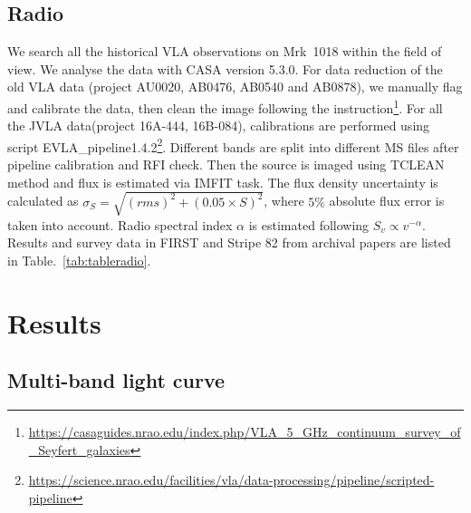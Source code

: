 \documentclass[twocolumn]{aastex63}
\begin{document}





\subsection{Radio}
We search all the historical VLA observations on Mrk~1018 within the field of view. We analyse the data with CASA version 5.3.0\citep{2007ASPC..376..127M}. For data reduction of the old VLA data (project AU0020, AB0476, AB0540 and AB0878), we manually flag and calibrate the data, then clean the image following the instruction\footnote{\url{https://casaguides.nrao.edu/index.php/VLA_5_GHz_continuum_survey_of_Seyfert_galaxies}}. For all the JVLA data(project 16A-444, 16B-084), calibrations are performed using script EVLA\_pipeline1.4.2\footnote{\url{https://science.nrao.edu/facilities/vla/data-processing/pipeline/scripted-pipeline}}. Different bands are split into different MS files after pipeline calibration and RFI check. Then the source is imaged using TCLEAN method and flux is estimated via IMFIT task. The flux density uncertainty is calculated as $\sigma_{S}=\sqrt{(rms)^2+(0.05\times S)^2}$, where $5\%$ absolute flux error is taken into account. Radio spectral index $\alpha$ is estimated following $S_v \propto v^{-\alpha}$. Results and survey data in FIRST\citep{1994ASPC...61..165B,1995ApJ...450..559B} and Stripe 82\citep{2011AJ....142....3H} from archival papers are listed in Table.~\ref{tab:tableradio}.

\section{Results}
\label{sec:result}

\subsection{Multi-band light curve}
\end{document}
